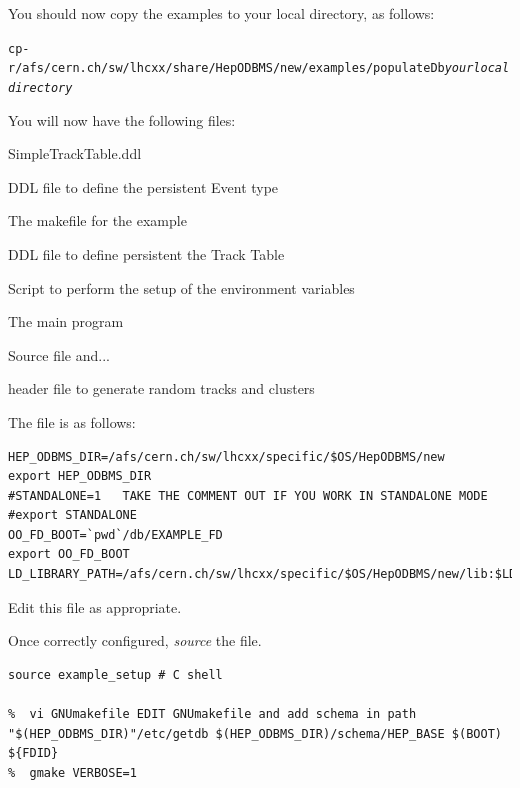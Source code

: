 \par

You should now copy the examples to your local directory, as follows:
\begin{alltt}

cp -r /afs/cern.ch/sw/lhcxx/share/HepODBMS/new/examples/populateDb \emph{your local directory}
\end{alltt}

\par

You will now have the following files:\begin{DLtt}{SimpleTrackTable.ddl}
\item[Event.ddl]DDL file to define the persistent Event type
\item[GNUmakefile]The makefile for the example
\item[SimpleTrackTable.ddl]DDL file to define persistent the Track Table
\item[example_setup]Script to perform the setup of the environment variables
\item[populateDb.cpp]The main program
\item[randomSource.cpp]Source file and...
\item[randomSource.h]header file to generate random tracks and clusters
\end{DLtt}

\par

The  file is as follows:
\begin{verbatim}
HEP_ODBMS_DIR=/afs/cern.ch/sw/lhcxx/specific/$OS/HepODBMS/new 
export HEP_ODBMS_DIR 
#STANDALONE=1   TAKE THE COMMENT OUT IF YOU WORK IN STANDALONE MODE 
#export STANDALONE 
OO_FD_BOOT=`pwd`/db/EXAMPLE_FD 
export OO_FD_BOOT 
LD_LIBRARY_PATH=/afs/cern.ch/sw/lhcxx/specific/$OS/HepODBMS/new/lib:$LD_LIBRARY_PATH 
\end{verbatim}

\par

Edit this file as appropriate.
\par

Once correctly configured, \emph{source} the file.
\begin{verbatim}
source example_setup # C shell

%  vi GNUmakefile EDIT GNUmakefile and add schema in path 
"$(HEP_ODBMS_DIR)"/etc/getdb $(HEP_ODBMS_DIR)/schema/HEP_BASE $(BOOT) ${FDID}
%  gmake VERBOSE=1 
\end{verbatim}

